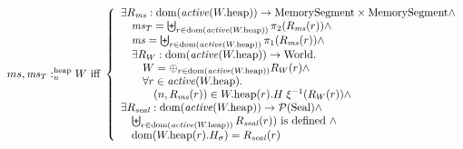 \documentclass[a4paper]{article}
\begin{document}
\[
  \memSatHeap{ms,\ms_T}{W} \text{ iff } 
  \left\{
    \begin{array}{l}
      \exists R_\ms : \dom(\activeReg{\pwheap}) \fun \MemSeg \times \MemSeg \wedge \\
      \quad \ms_T = \biguplus_{r \in \dom(\activeReg{\pwheap})} \pi_2(R_\ms(r)) \wedge \\
      \quad \ms = \biguplus_{r \in \dom(\activeReg{\pwheap})} \pi_1(R_\ms(r)) \wedge \\
      \quad \exists R_W : \dom(\activeReg{\pwheap}) \fun \World\ldotp\\
      \qquad W = \oplus_{r \in \dom(\activeReg{\pwheap})} R_W(r) \wedge\\
      \qquad \forall r \in \activeReg{\pwheap} \ldotp \\
      \qquad \quad \npair{R_\ms(r)} \in  \pwheap(r).H \; \xi^{-1}(R_W(r)) \wedge\\
      \exists R_\var{seal} : \dom(\activeReg{\pwheap}) \fun \powerset{\Seal} \wedge\\
      \quad \biguplus_{r \in \dom(\activeReg{\pwheap})} R_\var{seal}(r)) \text{ is defined } \wedge\\
      \quad \dom(\pwheap(r).H_\sigma) = R_\var{seal}(r)
    \end{array}
  \right.
\]
\end{document}
